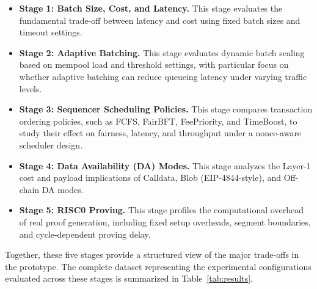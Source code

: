 \begin{itemize}
    \item \textbf{Stage 1: Batch Size, Cost, and Latency.} This stage evaluates the fundamental trade-off between latency and cost using fixed batch sizes and timeout settings.

    \item \textbf{Stage 2: Adaptive Batching.} This stage evaluates dynamic batch scaling based on mempool load and threshold settings, with particular focus on whether adaptive batching can reduce queueing latency under varying traffic levels.

    \item \textbf{Stage 3: Sequencer Scheduling Policies.} This stage compares transaction ordering policies, such as FCFS, FairBFT, FeePriority, and TimeBoost, to study their effect on fairness, latency, and throughput under a nonce-aware scheduler design.

    \item \textbf{Stage 4: Data Availability (DA) Modes.} This stage analyzes the Layer-1 cost and payload implications of Calldata, Blob (EIP-4844-style), and Off-chain DA modes.

    \item \textbf{Stage 5: RISC0 Proving.} This stage profiles the computational overhead of real proof generation, including fixed setup overheads, segment boundaries, and cycle-dependent proving delay.
\end{itemize}

Together, these five stages provide a structured view of the major trade-offs in the prototype. The complete dataset representing the experimental configurations evaluated across these stages is summarized in Table~\ref{tab:results}.


